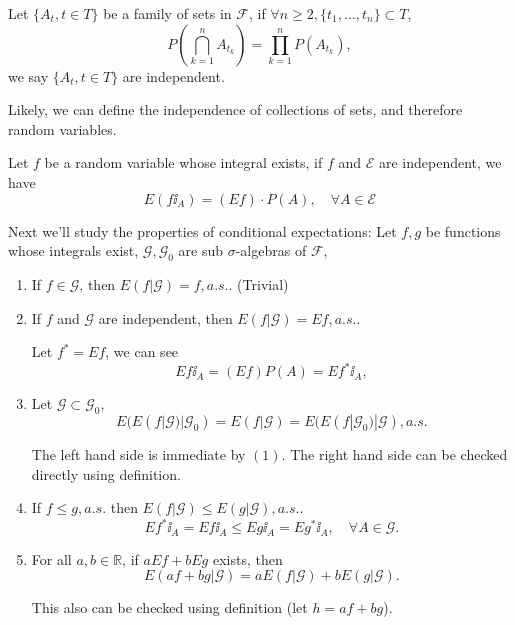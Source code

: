 \begin{definition}
	Let $ \{A_t, t\in T\}$ be a family of sets in $\mathscr{F}$, if
	$\forall n\ge 2, \{t_1, \dots, t_n\} \subset T$,
	\[
	P\left(\bigcap_{k=1}^n A_{t_k}\right) = \prod_{k=1}^n P(A_{t_k}),
	\]
	we say $\{A_t, t\in T\}$ are independent.

	Likely, we can define the independence of collections of sets,
	and therefore random variables.
\end{definition}

\begin{lemma}
	Let $f$ be a random variable whose integral exists, if $f$ and $\mathscr{E}$ are
	independent, we have
	\[
	E(f\ii_A) = (Ef) \cdot P(A), \quad\forall A\in \mathscr{E}
	\]
\end{lemma}

Next we'll study the properties of conditional expectations:
Let $f, g$ be functions whose integrals exist, $\mathscr{G}, \mathscr{G}_0$ are
sub $\sigma$-algebras of  $\mathscr{F}$,
\begin{enumerate}[\indent(1)]
	\item If $f\in \mathscr{G}$, then $E(f|\mathscr{G}) = f, a.s.$.
		(Trivial)
	\item If $f$ and $\mathscr{G}$ are independent,
		then $E(f|\mathscr{G}) = Ef, a.s.$.

		Let $f^* = Ef$, we can see
		\[
		Ef\ii_A = (Ef)P(A) = Ef^*\ii_A,
		\]
	\item Let $\mathscr{G} \subset \mathscr{G}_0$,
		\[
		E(E(f|\mathscr{G})|\mathscr{G}_0) = E(f|\mathscr{G})
		= E(E(f|\mathscr{G}_0)|\mathscr{G}), a.s.
		\]

		The left hand side is immediate by $(1)$. The right hand side
		can be checked directly using definition.

	\item If $f\le g, a.s.$ then $E(f|\mathscr{G}) \le E(g|\mathscr{G}), a.s.$.
		\[
		Ef^*\ii_A = Ef\ii_A \le Eg\ii_A = Eg^*\ii_A, \quad \forall A\in \mathscr{G}.
		\]
	\item For all $a,b\in \mathbb{R}$, if $aEf + bEg$ exists, then
		\[
		E(af+bg | \mathscr{G}) = aE(f|\mathscr{G}) + bE(g|\mathscr{G}).
		\]

		This also can be checked using definition (let $h = af+bg$).
\end{enumerate}

